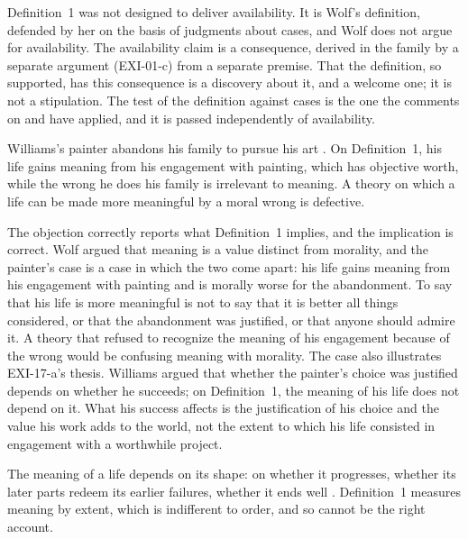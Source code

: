 \begin{reply}
Definition~1 was not designed to deliver availability. It is Wolf's definition, defended by her on the basis of judgments about cases, and Wolf does not argue for availability. The availability claim is a consequence, derived in the family by a separate argument (EXI-01-c) from a separate premise. That the definition, so supported, has this consequence is a discovery about it, and a welcome one; it is not a stipulation. The test of the definition against cases is the one the comments on  and  have applied, and it is passed independently of availability.
\end{reply}

\begin{objection}\label{o:gauguin}
Williams's painter abandons his family to pursue his art \citep{Williams1981b}. On Definition~1, his life gains meaning from his engagement with painting, which has objective worth, while the wrong he does his family is irrelevant to meaning. A theory on which a life can be made more meaningful by a moral wrong is defective.
\end{objection}

\begin{reply}
The objection correctly reports what Definition~1 implies, and the implication is correct. Wolf argued that meaning is a value distinct from morality, and the painter's case is a case in which the two come apart: his life gains meaning from his engagement with painting and is morally worse for the abandonment. To say that his life is more meaningful is not to say that it is better all things considered, or that the abandonment was justified, or that anyone should admire it. A theory that refused to recognize the meaning of his engagement because of the wrong would be confusing meaning with morality. The case also illustrates EXI-17-a's thesis. Williams argued that whether the painter's choice was justified depends on whether he succeeds; on Definition~1, the meaning of his life does not depend on it. What his success affects is the justification of his choice and the value his work adds to the world, not the extent to which his life consisted in engagement with a worthwhile project.
\end{reply}

\begin{objection}[Shape]\label{o:shape}
The meaning of a life depends on its shape: on whether it progresses, whether its later parts redeem its earlier failures, whether it ends well \citep{Velleman1991,Kauppinen2012}. Definition~1 measures meaning by extent, which is indifferent to order, and so cannot be the right account.
\end{objection}


